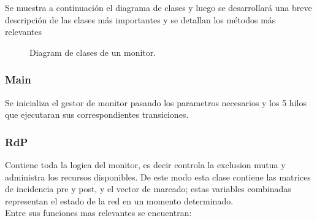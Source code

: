 \documentclass[10pt, a4paper,notitlepage]{article}
\begin{document}
Se muestra a continuación el diagrama de clases y luego se desarrollará una breve descripción de las clases más importantes y se detallan los métodos más relevantes
\begin{figure}[H] %
	\caption{Diagram de clases de un monitor.}
	\label{fig:clases}
\end{figure}

\subsubsection{Main}
Se inicializa el gestor de monitor pasando los parametros necesarios y los 5 hilos que ejecutaran sus correspondientes transiciones.

\subsubsection{RdP}
Contiene toda la logica del monitor, es decir controla la exclusion mutua y administra los recursos disponibles. De este modo esta clase contiene las matrices de incidencia pre y post, y el vector de marcado; estas variables combinadas representan el estado de la red en un momento determinado. \\
Entre sus funciones mas relevantes se encuentran:
\end{document}
